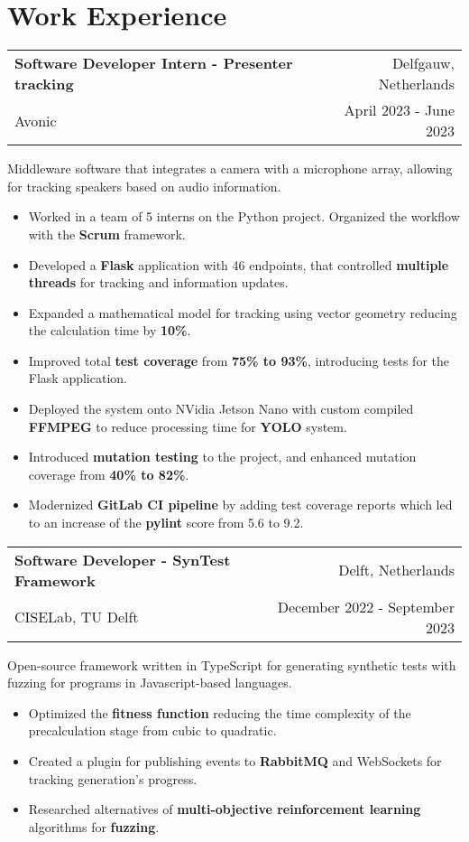 \documentclass[a4paper,21pt]{article}
\makeatletter
\newcommand{\nonBulletResumeSubheading}[4]{
  \vspace{-1pt}\normalsize{ \item[]
    \begin{tabular*}{0.97\textwidth}{l@{\extracolsep{\fill}}r}
      \textbf{#1} & #2 \\
      #3 & #4 \\
    \end{tabular*}}
    \vspace{-5pt}
}
\newcommand{\subItemOfItem}[1]{
    \item\small {#1}\vspace{-2pt}
}
\newcommand{\resumeSubHeadingListStart}{\begin{itemize}[leftmargin=*]}
\newcommand{\resumeSubHeadingListEnd}{\end{itemize}}
\newcommand{\resumeItemListStart}{\begin{itemize}}
\newcommand{\resumeItemListEnd}{\end{itemize}\vspace{-5pt}}
\makeatother
\begin{document}
\section{Work Experience}
  \resumeSubHeadingListStart
      \nonBulletResumeSubheading{Software Developer Intern - Presenter tracking}{Delfgauw, Netherlands}
    {Avonic}{April 2023 - June 2023}
    \vspace{6pt}
    \scriptsize { \small{\newline{} Middleware software that integrates a camera with a microphone array, allowing for tracking speakers based on audio information.}}
    \vspace{-4pt}
    \resumeItemListStart
        \subItemOfItem
            {Worked in a team of 5 interns on the Python project. Organized the workflow with the \textbf{Scrum} framework.}
         \subItemOfItem
            {Developed a \textbf{Flask} application with 46 endpoints, that controlled \textbf{multiple threads} for tracking and information updates.}
        \subItemOfItem
            {Expanded a mathematical model for tracking using vector geometry reducing the calculation time by \textbf{10\%}.}
        \subItemOfItem
            {Improved total \textbf{test coverage} from \textbf{75\% to 93\%}, introducing tests for the Flask application.}
        \subItemOfItem
            {Deployed the system onto NVidia Jetson Nano with custom compiled \textbf{FFMPEG} to reduce processing time for \textbf{YOLO} system.}
        \subItemOfItem
            {Introduced \textbf{mutation testing} to the project, and enhanced mutation coverage from \textbf{40\% to 82\%}.}
        \subItemOfItem
            {Modernized \textbf{GitLab CI pipeline} by adding test coverage reports which led to an increase of the \textbf{pylint} score from 5.6 to 9.2.}
      \resumeItemListEnd
    \nonBulletResumeSubheading{Software Developer - SynTest Framework}{Delft, Netherlands}
    {CISELab, TU Delft}{December 2022 - September 2023}
    \vspace{6pt}
    \scriptsize { \small{\newline{}Open-source framework written in TypeScript for generating synthetic tests with fuzzing for programs in Javascript-based languages.}}
    \vspace{-4pt}
    \resumeItemListStart
        \subItemOfItem
          {Optimized the \textbf{fitness function} reducing the time complexity of the precalculation stage from cubic to quadratic.}
        \subItemOfItem
          {Created a plugin for publishing events to \textbf{RabbitMQ} and WebSockets for tracking generation's progress.}
        \subItemOfItem
          {Researched alternatives of \textbf{multi-objective reinforcement learning} algorithms for \textbf{fuzzing}.}
      \resumeItemListEnd
\resumeSubHeadingListEnd
\vspace{-6pt}
\end{document}
